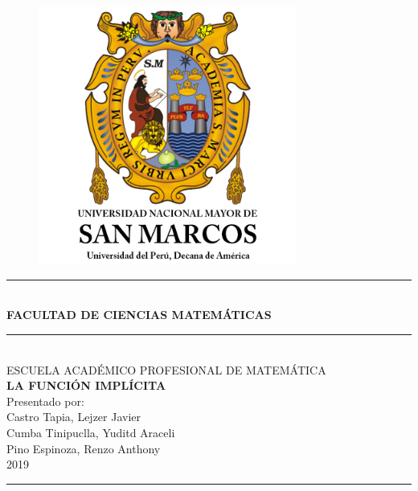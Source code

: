\documentclass[12pt]{book}
\begin{document}
\begin{titlepage}
\begin{center}
 \begin{figure}[htb]
\begin{center}
\includegraphics[width=8.5cm]{unmsm.jpg}
\vspace*{0.05in}
\end{center}
\end{figure}
\rule{100mm}{0.1mm}\\
\vspace*{0.05in}
{\LARGE\textbf{FACULTAD DE CIENCIAS MATEMÁTICAS}}\\
\rule{100mm}{0.1mm}\\
\vspace*{0.20in}
{\large ESCUELA ACADÉMICO PROFESIONAL DE MATEMÁTICA}
\\
\textsf{\huge\textbf{  LA FUNCIÓN IMPLÍCITA}} \\
\vspace*{0.3in}
{\large Presentado por:}\\
\vspace*{0.3in}
{\Large Castro Tapia, Lejzer Javier\\Cumba Tinipuclla, Yuditd Araceli\\
Pino Espinoza, Renzo Anthony}
\vspace*{0.3in}\\
{\LARGE 2019}\\
\rule{80mm}{0.1mm}\\
\vspace*{0.1in}
\end{center}
\end{titlepage}
\tableofcontents





\end{document}
